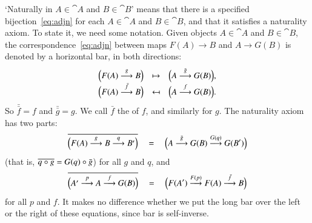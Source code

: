 `Naturally in $A \in \cat{A}$ and $B \in \cat{B}$' means that there is a
specified bijection~\eqref{eq:adjn} for each $A \in \cat{A}$ and $B \in
\cat{B}$, and that it satisfies a naturality axiom.  To state it, we need
some notation.  Given objects $A \in \cat{A}$ and $B \in \cat{B}$, the
correspondence~\eqref{eq:adjn} between maps $F(A) \to B$ and $A \to G(B)$
is denoted by a horizontal bar,%
%
%
in both directions:
\[
\begin{array}{ccc}
\Bigl(F(A) \toby{g} B\Bigr)             &
\mapsto	&
\Bigl(A \toby{\bar{g}} G(B)\Bigr),	\\
\Bigl(F(A) \toby{\bar{f}} B\Bigr)	&
\mapsfrom	&
\Bigl(A \toby{f} G(B)\Bigr).
\end{array}
\]
So $\bar{\bar{f}} = f$ and $\bar{\bar{g}} = g$.  We call
$\bar{f}$ the %
%
%
of $f$, and similarly for $g$.  The naturality%
%
%
axiom has two parts:
%
\begin{equation}
\label{eq:adj-nat-a}
\overline{\Bigl(F(A) \stackrel{g}{\longrightarrow} B \stackrel{q}{\longrightarrow} B'\Bigr)}
\quad
=
\quad
\Bigl(A \stackrel{\bar{g}}{\longrightarrow} G(B) \stackrel{G(q)}{\longrightarrow} G(B')\Bigr)
\end{equation}
%
(that is, $\overline{q \mathbin{\circ} g} = G(q) \mathbin{\circ} \bar{g}$) for all $g$ and $q$, and
%
\begin{equation}
\label{eq:adj-nat-b}
\overline{\Bigl(A' \stackrel{p}{\longrightarrow} A \stackrel{f}{\longrightarrow} G(B)\Bigr)}
\quad
=
\quad
\Bigl(F(A') \stackrel{F(p)}{\longrightarrow} F(A) \stackrel{\bar{f}}{\longrightarrow} B\Bigr)
\end{equation}
%
for all $p$ and $f$.  It makes no difference whether we put the long bar
over the left or the right of these equations, since bar is self-inverse.


